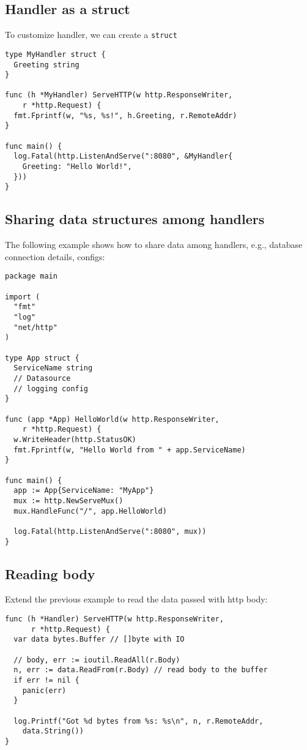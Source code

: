 \documentclass[11pt, letterpaper]{article}
\begin{document}
\subsection{Handler as a struct}

To customize handler, we can create a \verb|struct|

\begin{verbatim}
type MyHandler struct {
  Greeting string
}

func (h *MyHandler) ServeHTTP(w http.ResponseWriter,
    r *http.Request) {
  fmt.Fprintf(w, "%s, %s!", h.Greeting, r.RemoteAddr)
}

func main() {
  log.Fatal(http.ListenAndServe(":8080", &MyHandler{
    Greeting: "Hello World!",
  }))
}
\end{verbatim}

\subsection{Sharing data structures among handlers}

The following example shows how to share data among handlers, e.g., database connection details, configs:

\begin{verbatim}
package main

import (
  "fmt"
  "log"
  "net/http"
)

type App struct {
  ServiceName string
  // Datasource
  // logging config
}

func (app *App) HelloWorld(w http.ResponseWriter,
    r *http.Request) {
  w.WriteHeader(http.StatusOK)
  fmt.Fprintf(w, "Hello World from " + app.ServiceName)
}

func main() {
  app := App{ServiceName: "MyApp"}
  mux := http.NewServeMux()
  mux.HandleFunc("/", app.HelloWorld)

  log.Fatal(http.ListenAndServe(":8080", mux))
}
\end{verbatim}

\subsection{Reading body}

Extend the previous example to read the data passed with http body:

\begin{verbatim}
func (h *Handler) ServeHTTP(w http.ResponseWriter,
      r *http.Request) {
  var data bytes.Buffer // []byte with IO
  
  // body, err := ioutil.ReadAll(r.Body)
  n, err := data.ReadFrom(r.Body) // read body to the buffer
  if err != nil {  
    panic(err) 
  }

  log.Printf("Got %d bytes from %s: %s\n", n, r.RemoteAddr,
    data.String())
}
\end{verbatim}
\end{document}
